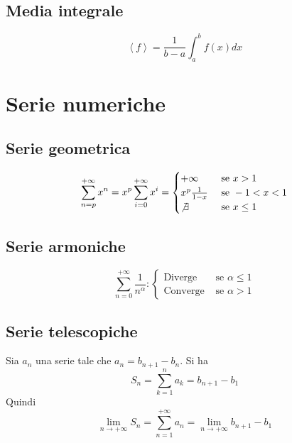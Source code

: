 \documentclass[11pt]{article}
\theoremstyle{definition}
\theoremstyle{remark}
\newcommand{\Span}[1]{\left\langle{#1}\right\rangle}
\begin{document}
\subsection*{Media integrale}
\begin{equation*}
    \Span{f} = \frac{1}{b-a}\int_{a}^{b} f(x) dx
\end{equation*}

\section*{Serie numeriche}
\subsection*{Serie geometrica}
\begin{equation*}
    \sum_{n=p}^{+\infty}x^n = x^p\sum_{i=0}^{+\infty}x^i=\begin{cases}
        +\infty & \text{ se } x>1 \\
        x^p\frac{1}{1-x} & \text{ se } -1<x<1 \\
        \not\exists & \text{ se } x\leq 1
    \end{cases}
\end{equation*}

\subsection*{Serie armoniche}
\begin{equation*}
    \sum_{n=0}^{+\infty} \frac{1}{n^{\alpha}}:\begin{cases}
        \text{Diverge} & \text{ se }\alpha\leq 1 \\
        \text{Converge} & \text{ se } \alpha > 1
    \end{cases}
\end{equation*}

\subsection*{Serie telescopiche}
Sia $a_n$ una serie tale che $a_n = b_{n+1} - b_n$. Si ha
\begin{equation*}
    S_n = \sum_{k=1}^{n}a_k = b_{n+1}-b_1
\end{equation*}
Quindi
\begin{equation*}
    \lim_{n\to+\infty}S_n = \sum_{n=1}^{+\infty}a_n = \lim_{n\to+\infty}b_{n+1}-b_1
\end{equation*}

\newpage
\end{document}
